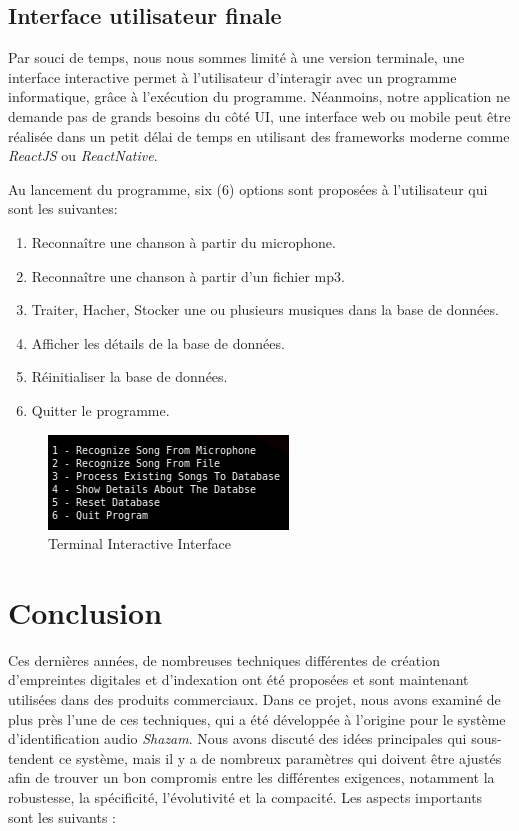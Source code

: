 \documentclass[10pt, report, english]{report}
\begin{document}
\section{Interface utilisateur finale}
Par souci de temps, nous nous sommes limité à une version terminale, une interface interactive permet à l'utilisateur d'interagir avec un programme informatique, grâce à l'exécution du programme. Néanmoins, notre application ne demande pas de grands besoins du côté UI, une interface web ou mobile peut être réalisée dans un petit délai de temps en utilisant des frameworks moderne comme \textit{ReactJS} ou \textit{ReactNative}.\\\par
Au lancement du programme, six (6) options sont proposées à l'utilisateur qui sont les suivantes:\\

\begin{enumerate}
	\item Reconnaître une chanson à partir du microphone.
	\item Reconnaître une chanson à partir d’un fichier mp3.
	\item Traiter, Hacher, Stocker une ou plusieurs musiques dans la base de données.
	\item Afficher les détails de la base de données.
	\item Réinitialiser la base de données.
	\item Quitter le programme.
\end{enumerate}

\begin{figure}[H]
	\centering
	\includegraphics[scale=0.8]{img/options.png}
	\caption{Terminal Interactive Interface}
\end{figure}


\chapter{Conclusion}
Ces dernières années, de nombreuses techniques différentes de création d'empreintes digitales et d'indexation ont été proposées et sont maintenant utilisées dans des produits commerciaux. Dans ce projet, nous avons examiné de plus près l'une de ces techniques, qui a été développée à l'origine pour le système d'identification audio \textit{Shazam}. Nous avons discuté des idées principales qui sous-tendent ce système, mais il y a de nombreux paramètres qui doivent être ajustés afin de trouver un bon compromis entre les différentes exigences, notamment la robustesse, la spécificité, l'évolutivité et la compacité. Les aspects importants sont les suivants :\\
\end{document}
